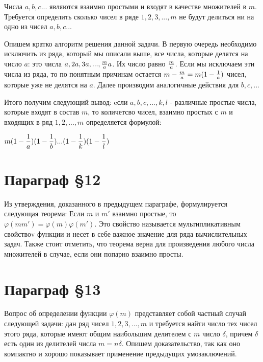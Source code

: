 Числа $a,b,c ...$ являются взаимно простыми и входят в качестве множителей в $m$. Требуется определить сколько чисел в ряде $1, 2, 3, ..., m$ не будут делиться ни на одно из чисел $a,b,c ...$

Опишем кратко алгоритм решения данной задачи. В первую очередь необходимо исключить из ряда, который мы описали выше, все числа, которые делятся на число $a$: это числа $a, 2a, 3a,..., {m \over a}a$. Их число равно $m \over a$. Если мы исключаем эти числа из ряда, то по понятным причинам остается $m - {m \over a} = m(1 - {1 \over a})$ чисел, которые уже не делятся на $a$. Далее производим аналогичные действия для $b, c, ...$

Итого получим следующий вывод: eсли $a, b, c, ..., k, l$ - различные простые числа, которые входят в состав $m$, то количетсво чисел, взаимно простых с $m$ и входящих в ряд $1, 2, ..., m$ определяется формулой:

\begin{center}
    $\displaystyle m(1 - {1 \over a})(1 - {1 \over b})...(1 - {1 \over k})(1 - {1 \over l})$
\end{center}

\section{Параграф \S 12}

Из утверждения, доказанного в предыдущем параграфе, формулируется следующая теорема: Если $m$ и $m'$ взаимно простые, то $\varphi(mm') = \varphi(m)\varphi(m')$. Это свойство называется мультипликативным свойствоv функции и несет в себе важное значение для ряда вычислительных задач. Также стоит отметить, что теорема верна для произведения любого числа множителей в случае, если они попарно взаимно просты.

\section{Параграф \S 13}

Вопрос об определении функции $\varphi(m)$ представляет собой частный случай следующей задачи: дан ряд чисел $1,2,3,...,m$ и требуется найти число тех чисел этого ряда, которые
имеют общим наибольшим делителем с $m$ число $\delta$, причем $\delta$ есть один из делителей числа $m = n\delta$. Опишем доказательство, так как оно компактно и хорошо показывает применение предыдущих умозаключений.

